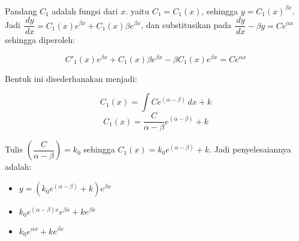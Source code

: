 Pandang \begin{math} C_1 \end{math} adalah fungsi dari \begin{math} x \end{math}. yaitu \begin{math} C_1 = C_1 (x) \end{math}, sehingga \begin{math} y = C_1 (x)^{\beta x} \end{math}. Jadi \begin{math} \dfrac{\, dy}{\, dx} = C_1 (x) e^{\beta x} + C_1 (x)
\beta e^{\beta x} \end{math}, dan substitusikan pada \begin{math} \dfrac{\, dy}{\, dx} - \beta y = Ce^{\alpha x} \end{math} sehingga diperoleh:

\begin{displaymath} C'_1 (x)e^{\beta x} + C_1 (x) \beta e^{\beta x} - \beta C_1 (x) e^{\beta x} = Ce^{\alpha x} \end{displaymath}

Bentuk ini disederhanakan menjadi:

\begin{displaymath} C_1 (x) = \int Ce^{(\alpha - \beta)} \, dx + k \end{displaymath}
\begin{displaymath} C_1 (x) = \dfrac{C}{\alpha - \beta}e^{(\alpha - \beta)} + k \end{displaymath}

Tulis \begin{math} (\dfrac{C}{\alpha - \beta}) = k_0 \end{math} sehingga \begin{math} C_1(x) = k_0 e^{(\alpha - \beta)} + k \end{math}. Jadi penyelesaiannya adalah:

\begin{itemize}

\item[] \begin{math} y = (k_0 e^{(\alpha - \beta)} + k)e^{\beta x}\end{math}
\item[] \begin{math} k_0 e^{(\alpha - \beta)x} e^{\beta x} + ke^{\beta x} \end{math} 
\item[] \begin{math} k_0 e^{\alpha x} + k e^{\beta x} \end{math} 

\end{itemize}

